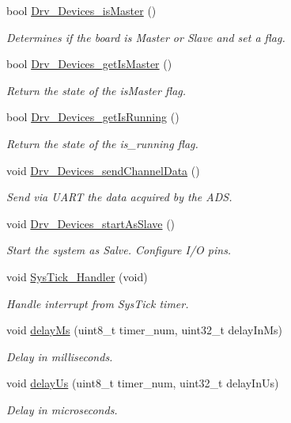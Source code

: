 \begin{DoxyCompactItemize}
bool \hyperlink{group___devices___library_ga92e403bbfcda965385b78ce10bbea47a}{Drv\+\_\+\+Devices\+\_\+is\+Master} ()
\begin{DoxyCompactList}\small\item\em Determines if the board is Master or Slave and set a flag. \end{DoxyCompactList}\item 
bool \hyperlink{group___devices___library_gaeab801d2d0a8823545cfde29704edc96}{Drv\+\_\+\+Devices\+\_\+get\+Is\+Master} ()
\begin{DoxyCompactList}\small\item\em Return the state of the is\+Master flag. \end{DoxyCompactList}\item 
bool \hyperlink{group___devices___library_ga65091ea2e7c2a0500683edf1bbc844ad}{Drv\+\_\+\+Devices\+\_\+get\+Is\+Running} ()
\begin{DoxyCompactList}\small\item\em Return the state of the is\+\_\+running flag. \end{DoxyCompactList}\item 
void \hyperlink{group___devices___library_ga828212dc5604557924cd8ea9e6252c6c}{Drv\+\_\+\+Devices\+\_\+send\+Channel\+Data} ()
\begin{DoxyCompactList}\small\item\em Send via U\+A\+R\+T the data acquired by the A\+D\+S. \end{DoxyCompactList}\item 
void \hyperlink{group___devices___library_ga7a5e2ac941ca1d1f308f910539005d4b}{Drv\+\_\+\+Devices\+\_\+start\+As\+Slave} ()
\begin{DoxyCompactList}\small\item\em Start the system as Salve. Configure I/\+O pins. \end{DoxyCompactList}\item 
void \hyperlink{group___devices___library_gab5e09814056d617c521549e542639b7e}{Sys\+Tick\+\_\+\+Handler} (void)
\begin{DoxyCompactList}\small\item\em Handle interrupt from Sys\+Tick timer. \end{DoxyCompactList}\item 
void \hyperlink{group___devices___library_gadde208bf0ea8bb35d8606d3859219a40}{delay\+Ms} (uint8\+\_\+t timer\+\_\+num, uint32\+\_\+t delay\+In\+Ms)
\begin{DoxyCompactList}\small\item\em Delay in milliseconds. \end{DoxyCompactList}\item 
void \hyperlink{group___devices___library_ga120f8cfcae7121ef62deee0473cf19ee}{delay\+Us} (uint8\+\_\+t timer\+\_\+num, uint32\+\_\+t delay\+In\+Us)
\begin{DoxyCompactList}\small\item\em Delay in microseconds. \end{DoxyCompactList}\end{DoxyCompactItemize}
